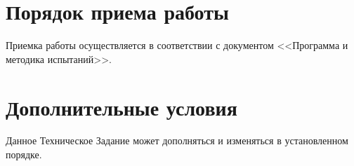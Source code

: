 \documentclass[russian,utf8,emptystyle]{eskdtext}
\begin{document}
\section{Порядок приема работы}
Приемка работы осуществляется в соответствии с документом <<Программа и методика испытаний>>.

\section{Дополнительные условия}
Данное Техническое Задание может дополняться и изменяться в установленном порядке.
\end{document}
